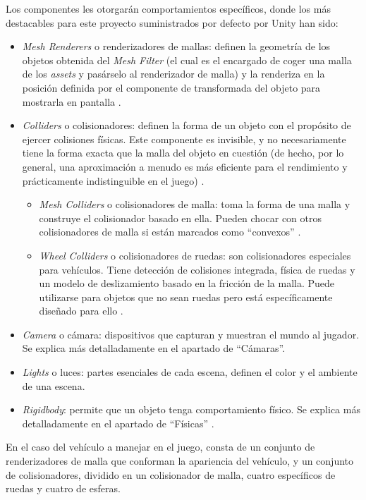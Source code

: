 Los componentes les otorgarán comportamientos específicos, donde los más destacables para este proyecto suministrados por defecto por Unity han sido: 
\begin{itemize}
\tightlist
    \item \textit{Mesh Renderers} o renderizadores de mallas: definen la geometría de los objetos obtenida del \textit{Mesh Filter} (el cual es el encargado de coger una malla de los \textit{assets} y pasárselo al renderizador de malla) y la renderiza en la posición definida por el componente de transformada del objeto para mostrarla en pantalla \cite{doc:meshrenderers}.
    \item \textit{Colliders} o colisionadores: definen la forma de un objeto con el propósito de ejercer colisiones físicas. Este componente es invisible, y no necesariamente tiene la forma exacta que la malla del objeto en cuestión (de hecho, por lo general, una aproximación a menudo es más eficiente para el rendimiento y prácticamente indistinguible en el juego) \cite{doc:colliders}.
   	\begin{itemize}
   	\tightlist
   		    \item \textit{Mesh Colliders} o colisionadores de malla: toma la forma de una malla y construye el colisionador basado en ella. Pueden chocar con otros colisionadores de malla si están marcados como ``convexos'' \cite{doc:meshcolliders}.
   		    \item \textit{Wheel Colliders} o colisionadores de ruedas: son colisionadores especiales para vehículos. Tiene detección de colisiones integrada, física de ruedas y un modelo de deslizamiento basado en la fricción de la malla. Puede utilizarse para objetos que no sean ruedas pero está específicamente diseñado para ello \cite{doc:wheelcolliders}.
   	\end{itemize}
   	\item \textit{Camera} o cámara: dispositivos que capturan y muestran el mundo al jugador. Se explica más detalladamente en el apartado de ``Cámaras''.
   	\item \textit{Lights} o luces: partes esenciales de cada escena, definen el color y el ambiente de una escena.
   	\item \textit{Rigidbody}: permite que un objeto tenga comportamiento físico. Se explica más detalladamente en el apartado de ``Físicas'' \cite{doc:lights}.
\end{itemize}

En el caso del vehículo a manejar en el juego, consta de un conjunto de renderizadores de malla que conforman la apariencia del vehículo, y un conjunto de colisionadores, dividido en un colisionador de malla, cuatro específicos de ruedas y cuatro de esferas.

